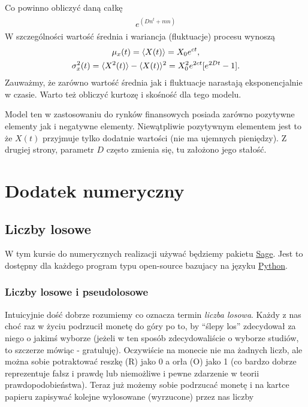 \documentclass[a4paper,12pt,polish]{sphinxmanual}
\makeatletter
\renewenvironment{notice}[2]{\begin{icsebox}\def\py@noticetype{#1}\par\strong{#2}}{\end{icsebox}}\makeatother
\makeatother
\begin{document}
Co powinno obliczyć daną całkę
\label{ch3/chIII033:equation-eqnplus}\begin{gather}
\begin{split}e^(Dn^t + mn)\end{split}\label{ch3/chIII033-eqnplus}
\end{gather}
W szczególności wartość średnia i wariancja (fluktuacje) procesu wynoszą
\label{ch3/chIII033:equation-eqn28}\begin{gather}
\begin{split}\mu_x(t)=\langle X(t)\rangle=X_0 e^{ct},\end{split}\label{ch3/chIII033-eqn28}\\\begin{split}\sigma_x^2(t) =\langle X^2(t)\rangle- \langle X(t)\rangle^2=X^2_0 e^{2ct} [e^{2Dt} - 1].\end{split}\notag
\end{gather}
Zauważmy, że zarówno wartość średnia jak i fluktuacje narastają eksponencjalnie w czasie. Warto też obliczyć kurtozę i skośność dla tego modelu.

Model ten w zastosowaniu do rynków finansowych posiada zarówno pozytywne elementy jak i negatywne elementy. Niewątpliwie pozytywnym elementem jest to że $X(t)$ przyjmuje tylko dodatnie wartości (nie ma ujemnych pieniędzy). Z drugiej strony, parametr $D$ często zmienia się, tu założono jego stałość.


\chapter{Dodatek numeryczny}
\label{index:dodatek-numeryczny}

\section{Liczby losowe}
\label{ch5/chV011:liczby-losowe}\label{ch5/chV011::doc}
\begin{notice}{note}{Uwaga:}
W tym kursie do numerycznych realizacji używać będziemy pakietu \href{http://sagemath.org/}{Sage}. Jest to dostępny dla
każdego program typu open-source bazujacy na języku \href{http://python.org/}{Python}.
\end{notice}


\subsection{Liczby losowe i pseudolosowe}
\label{ch5/chV011:liczby-losowe-i-pseudolosowe}
Intuicyjnie dość dobrze rozumiemy co oznacza termin \emph{liczba losowa}. Każdy z nas choć
raz w życiu podrzucił monetę do góry po to, by ``ślepy los'' zdecydował za niego o jakimś
wyborze (jeżeli w ten sposób zdecydowaliście o wyborze studiów, to szczerze mówiąc -
gratuluję). Oczywiście na monecie nie ma żadnych liczb, ale można sobie potraktować
reszkę (R) jako 0 a orła (O) jako 1 (co bardzo dobrze reprezentuje fałsz i prawdę lub niemożliwe
i pewne zdarzenie w teorii prawdopodobieństwa). Teraz już możemy sobie podrzucać monetę
i na kartce papieru zapisywać kolejne wylosowane (wyrzucone) przez nas liczby
\end{document}
